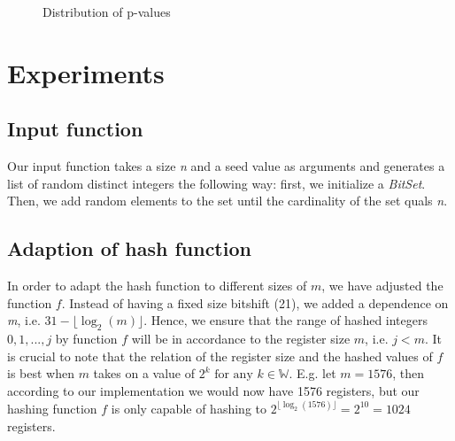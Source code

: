 \documentclass[12pt, a4paper]{article}
\begin{document}
\begin{figure}[h]
    \centering
    \caption{Distribution of p-values}
\end{figure}


\section{Experiments}

\subsection{Input function}
Our input function takes a size \emph{n} and a seed value as arguments and generates a list of random distinct integers the following way: first, we initialize a \emph{BitSet}. Then, we add random elements to the set until the cardinality of the set quals \emph{n}.

\subsection{Adaption of hash function}
In order to adapt the hash function to different sizes of $m$, we have adjusted the function \(f\). Instead of having a fixed size bitshift (21), we added a dependence on \emph{m}, i.e. \(31-\lfloor\log_2(m)\rfloor\). Hence, we ensure that the range of hashed integers ${0,1,...,j}$ by function \(f\) will be in accordance to the register size \(m\), i.e. $j<m$. It is crucial to note that the relation of the register size and the hashed values of $f$ is best when \(m\) takes on a value of $2^k \text{ for any } k\in\mathbb{W}$. E.g. let $m=1576$, then according to our implementation we would now have 1576 registers, but our hashing function $f$ is only capable of hashing to $2^{\lfloor\log_2(1576)\rfloor}=2^{10}=1024$ registers.  
\end{document}
